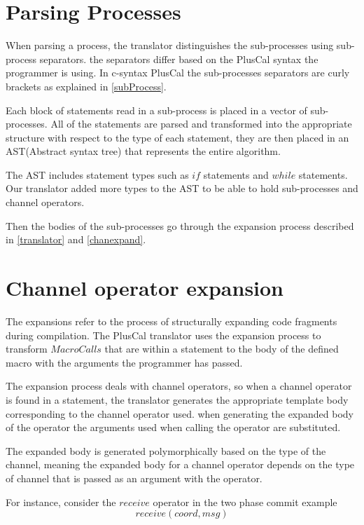 \documentclass{thesul}
\begin{document}
\section{Parsing Processes}

When parsing a process, the translator distinguishes the sub-processes using sub-process separators. the separators differ based on the PlusCal syntax the programmer is using. In c-syntax PlusCal the sub-processes separators are curly brackets as explained in \ref{subProcess}.

Each block of statements read in a sub-process is placed in a vector of sub-processes. All of the statements are parsed and transformed into the appropriate structure with respect to the type of each statement, they are then placed in an AST(Abstract syntax tree) that represents the entire algorithm.

The AST includes statement types such as $if$ statements and $while$ statements. Our translator added more types to the AST to be able to hold sub-processes and channel operators.


Then the bodies of the sub-processes go through the expansion process described in \ref{translator} and \ref{chanexpand}.

\label{parsesub}
\section{Channel operator expansion}

The expansions refer to the process of structurally expanding code fragments during compilation. The PlusCal translator uses the expansion process to transform $Macro Calls$ that are within a statement to the body of the defined macro with the arguments the programmer has passed.

The expansion process deals with channel operators, so when a channel operator is found in a statement, the translator generates the appropriate template body corresponding to the channel operator used. when generating the expanded body of the operator the arguments used when calling the operator are substituted.

The expanded body is generated polymorphically based on the type of the channel, meaning the expanded body for a channel operator  depends on the type of channel that is passed as an argument with the operator.

For instance, consider the $receive$ operator in the two phase commit example
\[
receive(coord, msg)
\]
\end{document}
